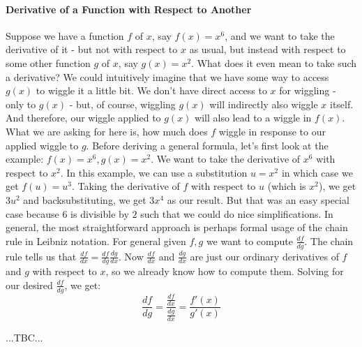\paragraph{Derivative of a Function with Respect to Another}
Suppose we have a function $f$ of $x$, say $f(x) = x^6$, and we want to take the derivative of it - but not with respect to $x$ as usual, but instead with respect to some other function $g$ of $x$, say $g(x) = x^2$. What does it even mean to take such a derivative? We could intuitively imagine that we have some way to access $g(x)$ to wiggle it a little bit. We don't have direct access to $x$ for wiggling - only to $g(x)$ - but, of course, wiggling $g(x)$ will indirectly also wiggle $x$ itself. And therefore, our wiggle applied to $g(x)$ will also lead to a wiggle in $f(x)$. What we are asking for here is, how much does $f$ wiggle in response to our applied wiggle to $g$. Before deriving a general formula, let's first look at the example: $f(x) = x^6, g(x) = x^2$. We want to take the derivative of $x^6$ with respect to $x^2$. In this example, we can use a substitution $u = x^2$ in which case we get $f(u) = u^3$. Taking the derivative of $f$ with respect to $u$ (which is $x^2$), we get $3 u^2$ and backsubstituting, we get $3 x^4$ as our result. But that was an easy special case because $6$ is divisible by $2$ such that we could do nice simplifications. In general, the most straightforward approach is perhaps formal usage of the chain rule in Leibniz notation. For general given $f,g$ we want to compute $\frac{df}{dg}$. The chain rule tells us that $\frac{df}{dx} = \frac{df}{dg} \frac{dg}{dx}$. Now $\frac{df}{dx}$ and $\frac{dg}{dx}$ are just our ordinary derivatives of $f$ and $g$ with respect to $x$, so we already know how to compute them. Solving for our desired $\frac{df}{dg}$, we get:
\begin{equation}
\frac{df}{dg} = \frac{ \frac{df}{dx} }{ \frac{dg}{dx} }
              = \frac{ f'(x) }{ g'(x) }
\end{equation}

...TBC...






